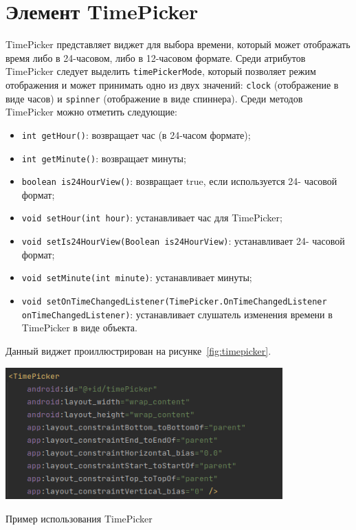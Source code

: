 \section{Элемент TimePicker}
TimePicker представляет виджет для выбора времени, который может 
отображать время либо в 24-часовом, либо в 12-часовом формате. Среди 
атрибутов TimePicker следует выделить \texttt{timePickerMode},
который позволяет режим отображения и может принимать одно из двух значений:
\texttt{clock} (отображение в виде часов) и
\texttt{spinner} (отображение в виде спиннера).
Среди методов TimePicker можно отметить следующие:

\begin{itemize}
	\item \texttt{int getHour()}: возвращает час (в 24-часом формате);
	\item \texttt{int getMinute()}: возвращает минуты;
	\item \texttt{boolean is24HourView()}: возвращает true, если
		используется 24- часовой формат;
	\item \texttt{void setHour(int hour)}: устанавливает час для TimePicker;
	\item \texttt{void setIs24HourView(Boolean is24HourView)}:
		устанавливает 24- часовой формат;
	\item \texttt{void setMinute(int minute)}: устанавливает минуты;
	\item \texttt{void setOnTimeChangedListener(TimePicker.OnTimeChangedListener 
		onTimeChangedListener)}: устанавливает слушатель изменения времени 
		в TimePicker в виде объекта.
\end{itemize}

Данный виджет проиллюстрирован на рисунке~\ref{fig:timepicker}.

\begin{image}
	\includegraphics[width=0.8\textwidth]{Screenshot from 2023-03-25 18-09-56.png}
	\caption{Пример использования TimePicker}
	\label{fig:timepicker}
\end{image}

